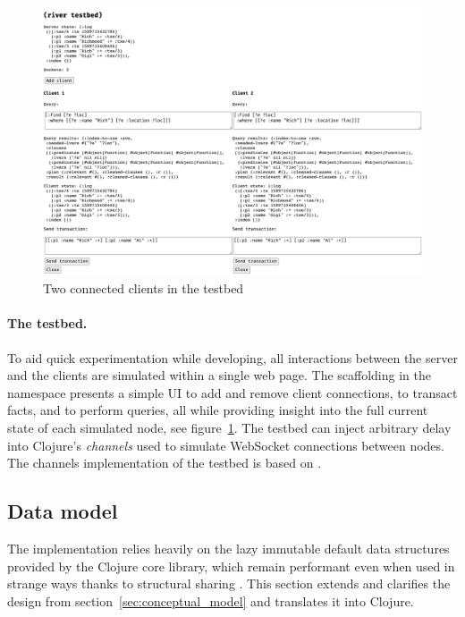 \cleardoublepage
\begin{figure}[!ht]
  \includegraphics[width=\linewidth]{images/testbed.png}
  \caption{Two connected clients in the testbed}
  \label{fig:testbed}
\end{figure}

\paragraph{The testbed.} To aid quick experimentation while developing, all interactions between the server and the clients are simulated within a single web page. The scaffolding in the  namespace presents a simple UI to add and remove client connections, to transact facts, and to perform queries, all while providing insight into the full current state of each simulated node, see figure~\ref{fig:testbed}. The testbed can inject arbitrary delay into Clojure's  \emph{channels} used to simulate WebSocket connections between nodes. The channels implementation of the testbed is based on \cite{ittyon}.


\cleardoublepage

\subsection{Data model}\label{sec:impl_datamodel}
The implementation relies heavily on the lazy immutable default data structures \cite{hickey2009persistent} provided by the Clojure core library, which remain performant even when used in strange ways thanks to structural sharing \cite{okasaki1999purely}. This section extends and clarifies the design from section~\ref{sec:conceptual_model} and translates it into Clojure.

